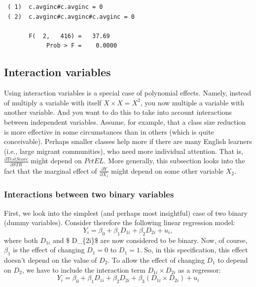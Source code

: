\documentclass[
]{book}
\begin{document}
\begin{verbatim}
 ( 1)  c.avginc#c.avginc = 0
 ( 2)  c.avginc#c.avginc#c.avginc = 0

       F(  2,   416) =   37.69
            Prob > F =    0.0000
\end{verbatim}

\hypertarget{interaction-variables}{%
\subsection{Interaction variables}\label{interaction-variables}}

Using interaction variables is a special case of polynomial effects. Namely, instead of multiply a variable with itself \(X\times X = X^2\), you now multiple a variable with another variable. And you want to do this to take into account interactions between independent variables. Assume, for example, that a class size reduction is more effective in some circumstances than in others (which is quite conceivable). Perhaps smaller classes help more if there are many English learners (i.e., large migrant communities), who need more individual attention. That is, \(\frac{\partial TestScore}{\partial STR}\) might depend on \(PctEL\). More generally, this subsection looks into the fact that the marginal effect of \(\frac{\partial Y}{\partial X_1}\) might depend on some other variable \(X_2\).

\hypertarget{interactions-between-two-binary-variables}{%
\subsubsection{Interactions between two binary variables}\label{interactions-between-two-binary-variables}}

First, we look into the simplest (and perhaps most insightful) case of two binary (dummy variables). Consider therefore the following linear regression model:
\begin{equation}
Y_i =\beta_0 +\beta_1 D_{1i} + \beta_2 D_{2i} +u_i, 
\end{equation}
where both \(D_{1i}\) and \$ D\_\{2i\}\$ are now considered to be binary. Now, of course, \(\beta_1\) is the effect of changing \(D_1=0\) to \(D_1=1\). So, in this specification, this effect doesn't depend on the value of \(D_2\). To allow the effect of changing \(D_1\) to depend on \(D_2\), we have to include the interaction term \(D_{1i} \times D_{2i}\) as a regressor:
\begin{equation}
Y_i =\beta_0 +\beta_1 D_{1i} + \beta_2 D_{2i} + \beta_3 (D_{1i} \times D_{2i}) + u_i
\end{equation}
\end{document}

